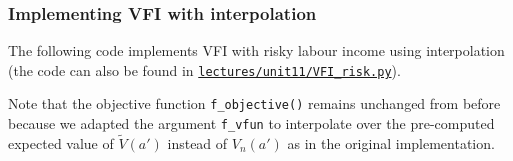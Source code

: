 \documentclass{scrartcl}
\begin{document}
    \hypertarget{implementing-vfi-with-interpolation}{%
\subsubsection*{Implementing VFI with
interpolation}\label{implementing-vfi-with-interpolation}}

The following code implements VFI with risky labour income using
interpolation (the code can also be found in
\href{../lectures/unit11/VFI_risk.py}{\texttt{lectures/unit11/VFI\_risk.py}}).

Note that the objective function \texttt{f\_objective()} remains
unchanged from before because we adapted the argument \texttt{f\_vfun}
to interpolate over the pre-computed expected value of
\(\widetilde{V}(a')\) instead of \(V_n(a')\) as in the original
implementation.
\end{document}
